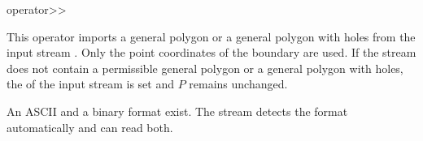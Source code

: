 
\ccHtmlNoClassLinks
\begin{ccRefFunction}{operator>>}
\label{refPolygon_with_holes_operator_rightshift}

\ccDefinition

This operator imports a general polygon or a general polygon with
holes from the input stream . Only the point coordinates of
the boundary are used. If the stream  does not contain a
permissible general polygon or a general polygon with holes, the
 of the input stream  is set and $P$ remains
unchanged.

An ASCII and a binary format exist. The stream detects the
format automatically and can read both.





\ccSeeAlso

\\ 
\\ 
\\ 


\end{ccRefFunction}

